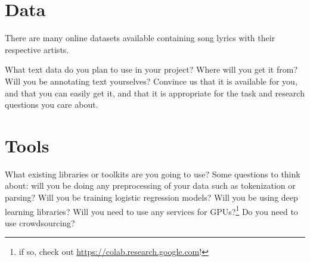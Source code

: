 \documentclass[11pt,a4paper]{article}
\begin{document}
\section{Data}
There are many online datasets available containing song lyrics with their respective artists.

What text data do you plan to use in your project? Where will you get it from? Will you be annotating text yourselves? Convince us that it is available for you, and that you can easily get it, and that it is appropriate for the task and research questions you care about.

\section{Tools}
What existing libraries or toolkits are you going to use? Some questions to think about: will you be doing any preprocessing of your data such as tokenization or parsing? Will you be training logistic regression models? Will you be using deep learning libraries? Will you need to use any services for GPUs?\footnote{if so, check out \url{https://colab.research.google.com}!} Do you need to use crowdsourcing?


\footnotesize

\end{document}
